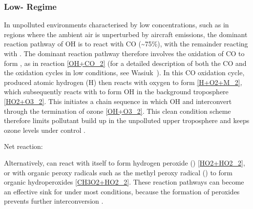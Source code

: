 \subsubsection{Low- Regime}
In unpolluted environments characterised by low  concentrations, such as in regions where the ambient air is unperturbed by aircraft emissions, the dominant reaction pathway of OH is to react with CO (\textasciitilde75\%), with the remainder reacting with  \cite{Thompson1992}. The dominant reaction pathway therefore involves the oxidation of CO to form , as in reaction \eqref{OH+CO_2} (for a detailed description of both the CO and the  oxidation cycles in low  conditions, see Wasiuk\ \cite{Wasiuk2014}). In this CO oxidation cycle, produced atomic hydrogen (H) then reacts with oxygen to form  \eqref{H+O2+M_2}, which subsequently reacts with  to form OH in the background troposphere \eqref{HO2+O3_2}. This initiates a chain sequence in which OH and  interconvert through the termination of ozone \eqref{OH+O3_2}. This clean condition scheme therefore limits pollutant build up in the unpolluted upper troposphere and keeps ozone levels under control \cite{Jacob1999}.





Net reaction: 

Alternatively,  can react with itself to form hydrogen peroxide () \eqref{HO2+HO2_2}, or with organic peroxy radicals such as the methyl peroxy radical () to form organic hydroperoxides \eqref{CH3O2+HO2_2}. These reaction pathways can become an effective sink for  under most conditions, because the formation of peroxides prevents further  interconversion \cite{Gunz1990}.



